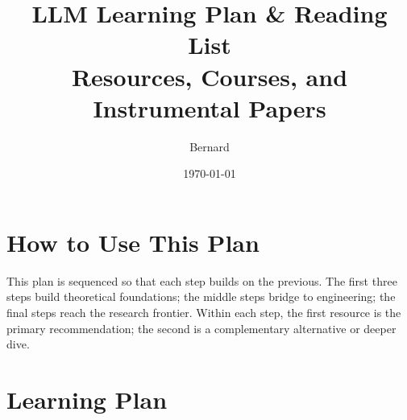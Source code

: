 \documentclass[11pt,a4paper]{article}
\begin{document}
\title{\Huge\textbf{LLM Learning Plan \& Reading List}\\[0.5cm]
	\large Resources, Courses, and Instrumental Papers}
\author{Bernard}
\date{\today}
\maketitle

\section*{How to Use This Plan}

This plan is sequenced so that each step builds on the previous. The first three steps
build theoretical foundations; the middle steps bridge to engineering; the final steps
reach the research frontier. Within each step, the first resource is the primary
recommendation; the second is a complementary alternative or deeper dive.

\vspace{0.5cm}

\section{Learning Plan}
\end{document}

